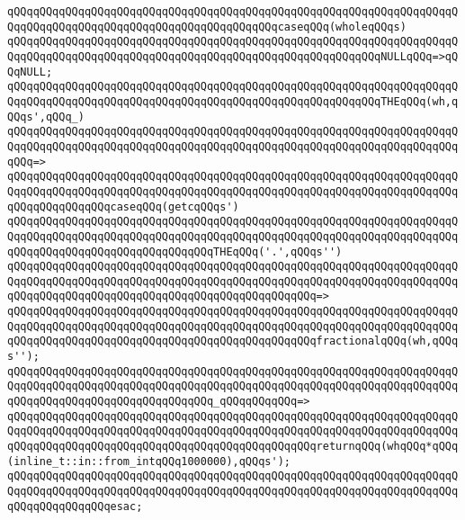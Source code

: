 \verb|qQQqqQQqqQQqqQQqqQQqqQQqqQQqqQQqqQQqqQQqqQQqqQQqqQQqqQQqqQQqqQQqqQQqqQQqqQQqqQQqqQQqqQQqqQQqqQQqqQQqqQQqqQQqqQQqcaseqQQq(wholeqQQqs)|\newline
\newline
\verb|qQQqqQQqqQQqqQQqqQQqqQQqqQQqqQQqqQQqqQQqqQQqqQQqqQQqqQQqqQQqqQQqqQQqqQQqqQQqqQQqqQQqqQQqqQQqqQQqqQQqqQQqqQQqqQQqqQQqqQQqqQQqqQQqNULLqQQq=>qQQqNULL;|\newline
\newline
\verb|qQQqqQQqqQQqqQQqqQQqqQQqqQQqqQQqqQQqqQQqqQQqqQQqqQQqqQQqqQQqqQQqqQQqqQQqqQQqqQQqqQQqqQQqqQQqqQQqqQQqqQQqqQQqqQQqqQQqqQQqqQQqqQQqTHEqQQq(wh,qQQqs',qQQq_)|\newline
\verb|qQQqqQQqqQQqqQQqqQQqqQQqqQQqqQQqqQQqqQQqqQQqqQQqqQQqqQQqqQQqqQQqqQQqqQQqqQQqqQQqqQQqqQQqqQQqqQQqqQQqqQQqqQQqqQQqqQQqqQQqqQQqqQQqqQQqqQQqqQQqqQQq=>|\newline
\verb|qQQqqQQqqQQqqQQqqQQqqQQqqQQqqQQqqQQqqQQqqQQqqQQqqQQqqQQqqQQqqQQqqQQqqQQqqQQqqQQqqQQqqQQqqQQqqQQqqQQqqQQqqQQqqQQqqQQqqQQqqQQqqQQqqQQqqQQqqQQqqQQqqQQqqQQqqQQqcaseqQQq(getcqQQqs')|\newline
\newline
\verb|qQQqqQQqqQQqqQQqqQQqqQQqqQQqqQQqqQQqqQQqqQQqqQQqqQQqqQQqqQQqqQQqqQQqqQQqqQQqqQQqqQQqqQQqqQQqqQQqqQQqqQQqqQQqqQQqqQQqqQQqqQQqqQQqqQQqqQQqqQQqqQQqqQQqqQQqqQQqqQQqqQQqqQQqqQQqTHEqQQq('.',qQQqs'')|\newline
\verb|qQQqqQQqqQQqqQQqqQQqqQQqqQQqqQQqqQQqqQQqqQQqqQQqqQQqqQQqqQQqqQQqqQQqqQQqqQQqqQQqqQQqqQQqqQQqqQQqqQQqqQQqqQQqqQQqqQQqqQQqqQQqqQQqqQQqqQQqqQQqqQQqqQQqqQQqqQQqqQQqqQQqqQQqqQQqqQQqqQQqqQQqqQQq=>|\newline
\verb|qQQqqQQqqQQqqQQqqQQqqQQqqQQqqQQqqQQqqQQqqQQqqQQqqQQqqQQqqQQqqQQqqQQqqQQqqQQqqQQqqQQqqQQqqQQqqQQqqQQqqQQqqQQqqQQqqQQqqQQqqQQqqQQqqQQqqQQqqQQqqQQqqQQqqQQqqQQqqQQqqQQqqQQqqQQqqQQqqQQqqQQqqQQqfractionalqQQq(wh,qQQqs'');|\newline
\newline
\verb|qQQqqQQqqQQqqQQqqQQqqQQqqQQqqQQqqQQqqQQqqQQqqQQqqQQqqQQqqQQqqQQqqQQqqQQqqQQqqQQqqQQqqQQqqQQqqQQqqQQqqQQqqQQqqQQqqQQqqQQqqQQqqQQqqQQqqQQqqQQqqQQqqQQqqQQqqQQqqQQqqQQqqQQqqQQq_qQQqqQQqqQQq=>|\newline
\verb|qQQqqQQqqQQqqQQqqQQqqQQqqQQqqQQqqQQqqQQqqQQqqQQqqQQqqQQqqQQqqQQqqQQqqQQqqQQqqQQqqQQqqQQqqQQqqQQqqQQqqQQqqQQqqQQqqQQqqQQqqQQqqQQqqQQqqQQqqQQqqQQqqQQqqQQqqQQqqQQqqQQqqQQqqQQqqQQqqQQqqQQqqQQqreturnqQQq(whqQQq*qQQq(inline_t::in::from_intqQQq1000000),qQQqs');|\newline
\verb|qQQqqQQqqQQqqQQqqQQqqQQqqQQqqQQqqQQqqQQqqQQqqQQqqQQqqQQqqQQqqQQqqQQqqQQqqQQqqQQqqQQqqQQqqQQqqQQqqQQqqQQqqQQqqQQqqQQqqQQqqQQqqQQqqQQqqQQqqQQqqQQqqQQqqQQqqQQqesac;|\newline
